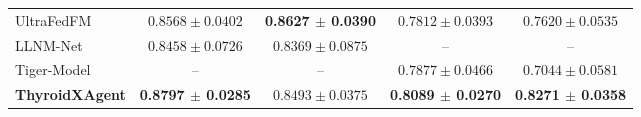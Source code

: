 \begin{table}[p]
\begin{threeparttable}
\begin{tabular}{lcccc}
UltraFedFM~\cite{jiang2025pretraining}
& $0.8568 \pm 0.0402$
& \textbf{0.8627 $\pm$ 0.0390}
& $0.7812 \pm 0.0393$
& $0.7620 \pm 0.0535$\\
LLNM-Net~\cite{Shen2025NatCommunLLNM}
& $0.8458 \pm 0.0726$
& $0.8369 \pm 0.0875$
& --
& --\\
Tiger-Model~\cite{Dai2025NatCommunThyroidSubtype}
& --
& --
& $0.7877 \pm 0.0466$
& $0.7044 \pm 0.0581$\\
\rowcolor{lightgray}
\textbf{ThyroidXAgent}
& \textbf{0.8797 $\pm$ 0.0285}
& $0.8493 \pm 0.0375$
& \textbf{0.8089 $\pm$ 0.0270}
& \textbf{0.8271 $\pm$ 0.0358}\\
\bottomrule
\end{tabular}
\end{threeparttable}
\end{table}

\clearpage
